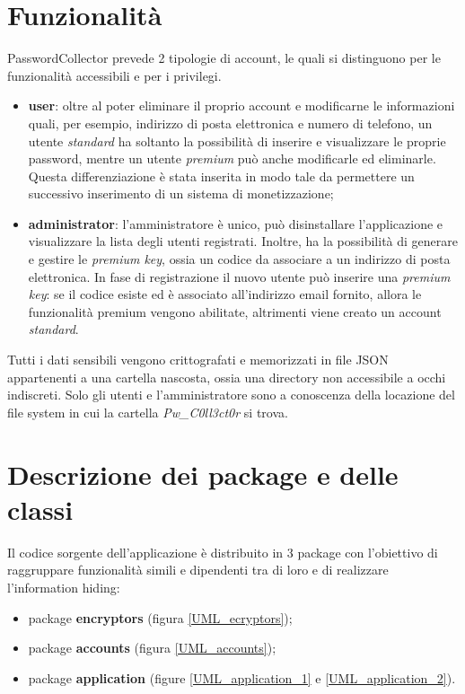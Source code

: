 \documentclass[a4paper, 12pt, one column, aas_macros]{article}
\begin{document}
	\section{Funzionalità}
	PasswordCollector prevede \num{2} tipologie di account, le quali si distinguono per le funzionalità accessibili e per i privilegi.
	\begin{itemize}
		\item \textbf{user}: oltre al poter eliminare il proprio account e modificarne le informazioni quali, per esempio, indirizzo di posta elettronica e numero di telefono, un utente \textit{standard} ha soltanto la possibilità di inserire e visualizzare le proprie password, mentre un utente \textit{premium} può anche modificarle ed eliminarle. Questa differenziazione è stata inserita in modo tale da permettere un successivo inserimento di un sistema di monetizzazione;
		\item \textbf{administrator}: l'amministratore è unico, può disinstallare l'applicazione e visualizzare la lista degli utenti registrati. Inoltre, ha la possibilità di generare e gestire le \textit{premium key}, ossia un codice da associare a un indirizzo di posta elettronica. In fase di registrazione il nuovo utente può inserire una \textit{premium key}: se il codice esiste ed è associato all'indirizzo email fornito, allora le funzionalità premium vengono abilitate, altrimenti viene creato un account \textit{standard}.
	\end{itemize}
	Tutti i dati sensibili vengono crittografati e memorizzati in file JSON appartenenti a una cartella nascosta, ossia una directory non accessibile a occhi indiscreti. Solo gli utenti e l'amministratore sono a conoscenza della locazione del file system in cui la cartella \textit{Pw\_C0ll3ct0r} si trova.
	
	\section{Descrizione dei package e delle classi}
	Il codice sorgente dell'applicazione è distribuito in \num{3} package con l'obiettivo di raggruppare funzionalità simili e dipendenti tra di loro e di realizzare l'information hiding:
	\begin{itemize}
		\item package \textbf{encryptors} (figura \ref{UML_ecryptors});
		\item package \textbf{accounts} (figura \ref{UML_accounts});
		\item package \textbf{application} (figure \ref{UML_application_1} e \ref{UML_application_2}).
	\end{itemize}
	
\end{document}

